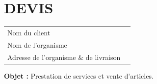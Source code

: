\documentclass[11pt,a4paper]{article}
\begin{document}
\begin{minipage}[t]{0.5\textwidth}
    \hspace*{0pt}\vspace*{\fill}
    \section*{\LARGE DEVIS}
\end{minipage}\begin{minipage}[t]{0.5\textwidth}
    \begin{framed}
        \begin{tabular}{ll}
            Nom du client                          \\
            Nom de l'organisme                     \\
            Adresse de l'organisme \& de livraison \\
        \end{tabular}
    \end{framed}
    \vspace{0.1cm}
\end{minipage}



\textbf{Objet :} Prestation de services et vente d'articles.

\vspace{0.5cm}
\end{document}
